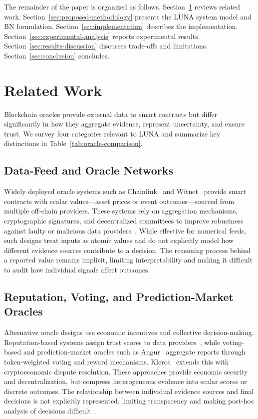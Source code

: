 \documentclass[journal]{IEEEtran}
\begin{document}
The remainder of the paper is organized as follows.
Section~\ref{sec:relatedwork} reviews related work.
Section~\ref{sec:proposed-methodology} presents the LUNA
system model and BN formulation.
Section~\ref{sec:implementation} describes the
implementation.
Section~\ref{sec:experimental-analysis} reports
experimental results.
Section~\ref{sec:results-discussion} discusses trade-offs
and limitations.
Section~\ref{sec:conclusion} concludes.


\section{Related Work}
\label{sec:relatedwork}

Blockchain oracles provide external data to smart
contracts but differ significantly in how they aggregate
evidence, represent uncertainty, and ensure trust.
We survey four categories relevant to LUNA and summarize
key distinctions in Table~\ref{tab:oracle-comparison}.

\subsection{Data-Feed and Oracle Networks}

Widely deployed oracle systems such as
Chainlink~\cite{breidenbach2021chainlink} and
Witnet~\cite{de2017witnet} provide smart contracts
with scalar values---asset prices or event
outcomes---sourced from multiple off-chain providers.
These systems rely on aggregation mechanisms,
cryptographic signatures, and decentralized committees
to improve robustness against faulty or malicious data
providers~\cite{pasdar2023connect,ezzat2022blockchain,mammadzada2020blockchain}.
While effective for numerical feeds, such designs treat
inputs as atomic values and do not explicitly model how
different evidence sources contribute to a decision.
The reasoning process behind a reported value remains
implicit, limiting interpretability and making it
difficult to audit how individual signals affect
outcomes.

\subsection{Reputation, Voting, and Prediction-Market
Oracles}

Alternative oracle designs use economic incentives and
collective decision-making.
Reputation-based systems assign trust scores to data
providers~\cite{chen2022decentralized,nelaturu2020public,
arshad2022reputable}, while voting-based and
prediction-market oracles such as
Augur~\cite{peterson2015augur} aggregate reports through
token-weighted voting and reward mechanisms.
Kleros~\cite{lesaege2019kleros} extends this with
cryptoeconomic dispute resolution.
These approaches provide economic security and
decentralization, but compress heterogeneous evidence
into scalar scores or discrete outcomes.
The relationship between individual evidence sources and
final decisions is not explicitly represented, limiting
transparency and making post-hoc analysis of decisions
difficult~\cite{pasdar2021blockchain}.
\end{document}

